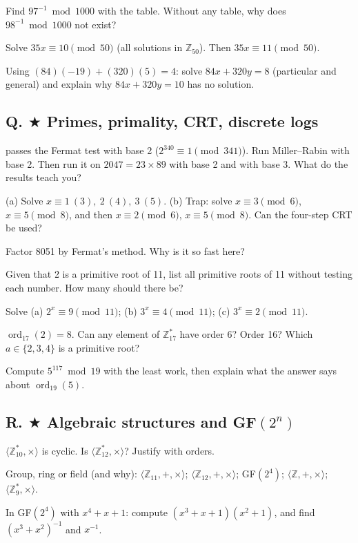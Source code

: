 \q Find $97^{-1} \bmod 1000$ with the table. Without any table, why does $98^{-1} \bmod 1000$ not exist?

\q Solve $35x \equiv 10 \pmod{50}$ (all solutions in $\mathbb{Z}_{50}$). Then $35x \equiv 11 \pmod{50}$.

\q Using $(84)(-19) + (320)(5) = 4$: solve $84x + 320y = 8$ (particular and general) and explain why $84x + 320y = 10$ has no solution.

\subsection*{Q. $\bigstar$ Primes, primality, CRT, discrete logs}
 passes the Fermat test with base 2 ($2^{340} \equiv 1 \pmod{341}$). Run Miller--Rabin with base 2. Then run it on $2047 = 23 \times 89$ with base 2 and with base 3. What do the results teach you?

\q (a) Solve $x \equiv 1 \ (3),\ 2\ (4),\ 3\ (5)$. (b) Trap: solve $x \equiv 3 \pmod 6$, $x \equiv 5 \pmod 8$, and then $x \equiv 2 \pmod 6$, $x \equiv 5 \pmod 8$. Can the four-step CRT be used?

\q Factor 8051 by Fermat's method. Why is it so fast here?

\q Given that 2 is a primitive root of 11, list all primitive roots of 11 without testing each number. How many should there be?

\q Solve (a) $2^x \equiv 9 \pmod{11}$; (b) $3^x \equiv 4 \pmod{11}$; (c) $3^x \equiv 2 \pmod{11}$.

\q $\operatorname{ord}_{17}(2) = 8$. Can any element of $\mathbb{Z}_{17}^*$ have order 6? Order 16? Which $a \in \{2, 3, 4\}$ is a primitive root?

\q Compute $5^{117} \bmod 19$ with the least work, then explain what the answer says about $\operatorname{ord}_{19}(5)$.

\subsection*{R. $\bigstar$ Algebraic structures and GF$(2^n)$}
\q $\langle \mathbb{Z}_{10}^*, \times\rangle$ is cyclic. Is $\langle \mathbb{Z}_{12}^*, \times\rangle$? Justify with orders.

\q Group, ring or field (and why): $\langle \mathbb{Z}_{11}, +, \times\rangle$; $\langle \mathbb{Z}_{12}, +, \times\rangle$; GF$(2^4)$; $\langle \mathbb{Z}, +, \times\rangle$; $\langle \mathbb{Z}_{9}^*, \times\rangle$.

\q In GF$(2^4)$ with $x^4 + x + 1$: compute $(x^3 + x + 1)(x^2 + 1)$, and find $(x^3 + x^2)^{-1}$ and $x^{-1}$.

